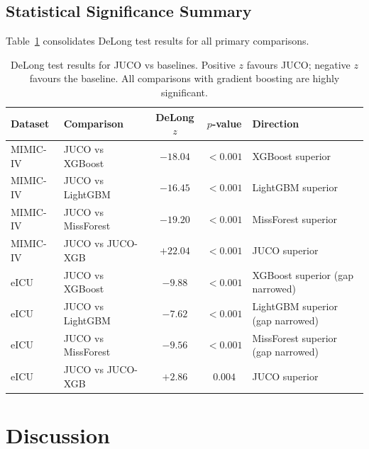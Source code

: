 \documentclass[a4paper,fleqn,longmktitle]{cas-sc}
\begin{document}
	
	
	
	\subsection{Statistical Significance Summary}
	\label{sec:stat_summary}
	
	Table~\ref{tab:delong} consolidates DeLong test results for all
	primary comparisons.
	
	\begin{table}[ht]
		\centering
		\caption{DeLong test results for JUCO vs baselines.
			Positive $z$ favours JUCO; negative $z$ favours the baseline.
			All comparisons with gradient boosting are highly significant.}
		\label{tab:delong}
		\small
		\begin{tabular}{llccl}
			\toprule
			\textbf{Dataset} & \textbf{Comparison} & \textbf{DeLong $z$} & \textbf{$p$-value} & \textbf{Direction} \\
			\midrule
			MIMIC-IV & JUCO vs XGBoost       & $-18.04$ & $<0.001$ & XGBoost superior \\
			MIMIC-IV & JUCO vs LightGBM      & $-16.45$ & $<0.001$ & LightGBM superior \\
			MIMIC-IV & JUCO vs MissForest    & $-19.20$ & $<0.001$ & MissForest superior \\
			MIMIC-IV & JUCO vs JUCO-XGB      & $+22.04$ & $<0.001$ & JUCO superior \\
			eICU     & JUCO vs XGBoost       & $-9.88$  & $<0.001$ & XGBoost superior (gap narrowed) \\
			eICU     & JUCO vs LightGBM      & $-7.62$  & $<0.001$ & LightGBM superior (gap narrowed) \\
			eICU     & JUCO vs MissForest    & $-9.56$  & $<0.001$ & MissForest superior (gap narrowed) \\
			eICU     & JUCO vs JUCO-XGB      & $+2.86$  & $0.004$  & JUCO superior \\
			\bottomrule
		\end{tabular}
	\end{table}

	
	\vspace{-20pt}
	\section{Discussion}
	\label{sec:discussion}
	
\end{document}
